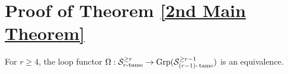 %	
%
%	
%



\section{Proof of Theorem \ref{2nd Main Theorem}}
\label{proof of the 2nd main theorem}
\begin{proposition}
\label{tame recognition theorem}
For $r\geq 4$,
	the loop functor $\Omega: {\mathcal{S}}^{\geq r}_{\text{$r$-tame}}\to \operatorname{Grp}({\mathcal{S}}^{\geq r-1}_{(r-1)\text{-}\operatorname{\operatorname{tame}}})$ is an equivalence. 
\end{proposition}

